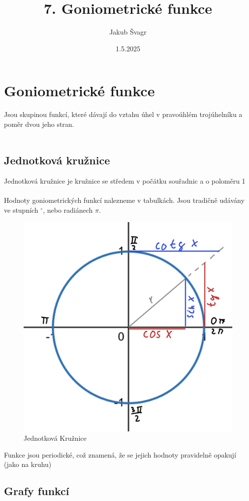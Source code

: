 \title{7. Goniometrické funkce}
\author{Jakub Švagr}
\date{1.5.2025}

\maketitle

\section{Goniometrické funkce}
Jsou skupinou funkcí, které dávají do vztahu úhel v pravoúhlém trojúhelníku a poměr dvou jeho stran. \\\\ 
\subsection{Jednotková kružnice}
Jednotková kružnice je kružnice se středem v počátku souřadnic a o poloměru 1\\\\ 
Hodnoty goniometrických funkcí nalezneme v tabulkách. Jsou tradičně udávány ve stupních $^\circ$, nebo radiánech $\pi$.
\begin{figure}[H]
        \centering
        \includegraphics[width=0.6\linewidth]{img/7_JednotkovaKruznice.png}
        \caption{Jednotková Kružnice} 
        \label{fig:Jednotková Kružnice}
\end{figure}
Funkce jsou periodické, což znamená, že se jejich hodnoty pravidelně opakují (jako na kruhu)
\subsection{Grafy funkcí}
